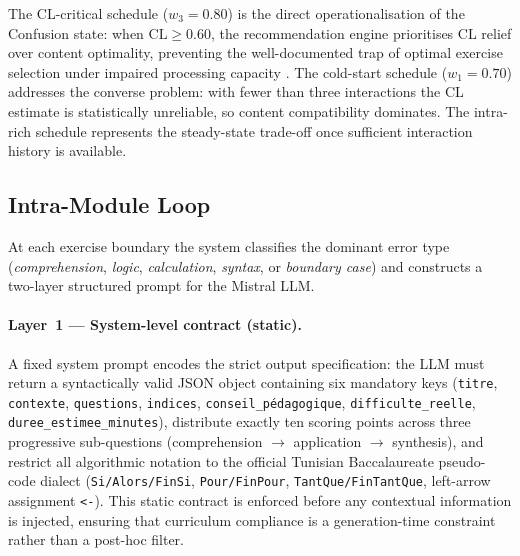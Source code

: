 \documentclass[ASNA,twocolumn]{USG} %
\begin{document}
The CL-critical schedule ($w_3 = 0.80$) is the direct
operationalisation of the Confusion state: when $\text{CL} \geq 0.60$,
the recommendation engine prioritises CL relief over content
optimality, preventing the well-documented trap of optimal exercise
selection under impaired processing capacity \cite{Sweller1988}.
The cold-start schedule ($w_1 = 0.70$) addresses the converse problem:
with fewer than three interactions the CL estimate is statistically
unreliable, so content compatibility dominates.
The intra-rich schedule represents the steady-state trade-off once
sufficient interaction history is available.

\subsection{Intra-Module Loop}
\label{sec:intraloop}

At each exercise boundary the system classifies the dominant error
type (\emph{comprehension}, \emph{logic}, \emph{calculation},
\emph{syntax}, or \emph{boundary case}) and constructs a two-layer
structured prompt for the Mistral LLM.

\paragraph{Layer~1 --- System-level contract (static).}
A fixed system prompt encodes the strict output specification:
the LLM must return a syntactically valid JSON object containing
six mandatory keys (\texttt{titre}, \texttt{contexte},
\texttt{questions}, \texttt{indices}, \texttt{conseil\_p\'{e}dagogique},
\texttt{difficulte\_reelle}, \texttt{duree\_estimee\_minutes}),
distribute exactly ten scoring points across three progressive
sub-questions (comprehension $\to$ application $\to$ synthesis),
and restrict all algorithmic notation to the official Tunisian
Baccalaureate pseudo-code dialect
(\texttt{Si/Alors/FinSi}, \texttt{Pour/FinPour},
\texttt{TantQue/FinTantQue}, left-arrow assignment \texttt{<-}).
This static contract is enforced before any contextual information is
injected, ensuring that curriculum compliance is a generation-time
constraint rather than a post-hoc filter.
\end{document}
